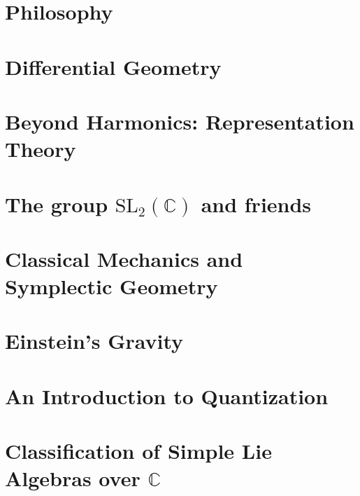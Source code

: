 \documentclass[11pt]{book}
\begin{document}
 
	









\chapter{Philosophy}


\chapter{Differential Geometry}


\chapter{Beyond Harmonics: Representation Theory}


\chapter{The group $\mathrm{SL}_2 (\mathbb{C})$ and friends}

\chapter{Classical Mechanics and Symplectic Geometry}

\chapter{Einstein's Gravity}

\chapter{An Introduction to Quantization}

\chapter{Classification of Simple Lie Algebras over $\mathbb{C}$}



\printindex
\end{document}
